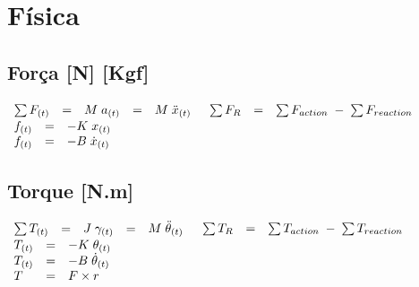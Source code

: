 \chapter{Física}
\begin{minipage}[c]{\linewidth}
	\section*{Força  [N] [Kgf]}
	\Large
	$\begin{array}{ l l l l l }
		\sum F_{(t)} & = & M \; a_{(t)} & = & M \; \ddot{x}_{(t)}
	\end{array}$
	\newline
	\newline
	$\begin{array}{ l l l }
		\sum F_{R} & = & \sum F_{action} \; - \; \sum F_{reaction}
	\end{array}$
	\newline
	\newline
	$\begin{array}{ l l l }
		f_{(t)} & = & -K \; x_{(t)} \\
		f_{(t)} & = & -B \; \dot{x}_{(t)}
	\end{array}$
	\newline
	\newline
\end{minipage}
\newline
\vspace{.6cm}
\newline
\begin{minipage}[c]{\linewidth}
	\section*{Torque [N.m]}
	\Large
	$\begin{array}{ l l l l l }
		\sum T_{(t)} & = & J \; \gamma_{(t)} & = & M \; \ddot{\theta}_{(t)}
	\end{array}$
	\newline
	\newline
	$\begin{array}{ l l l }
		\sum T_{R} & = & \sum T_{action} \; - \; \sum T_{reaction}
	\end{array}$
	\newline
	\newline
	$\begin{array}{ l l l }
		T_{(t)} & = & -K \; \theta_{(t)} \\
		T_{(t)} & = & -B \; \dot{\theta}_{(t)} \\
		T & = & F \times r
	\end{array}$
	\newline
	\newline
\end{minipage}
